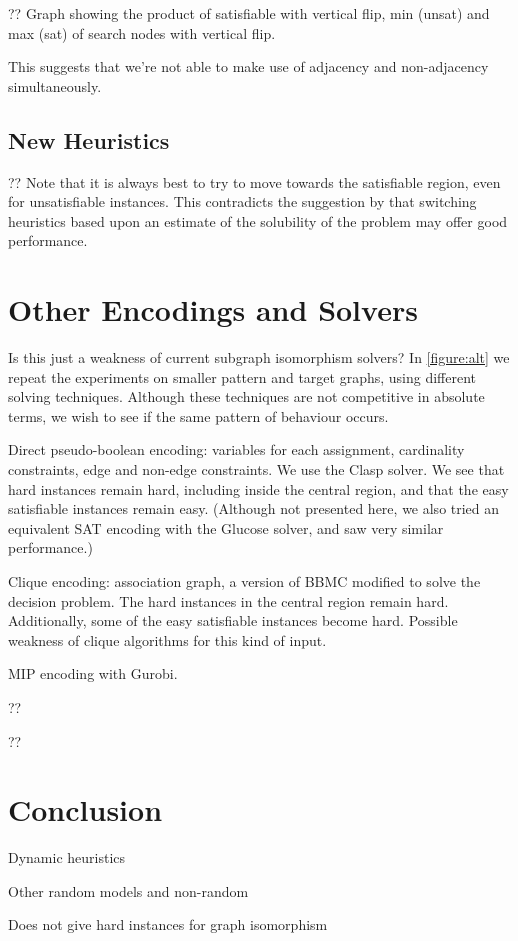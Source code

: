 \documentclass[letterpaper]{article}
\begin{document}
?? Graph showing the product of satisfiable with vertical flip, min (unsat) and max (sat) of search
nodes with vertical flip.

This suggests that we're not able to make use of adjacency and non-adjacency simultaneously.

\subsection{New Heuristics}

?? Note that it is always best to try to move towards the satisfiable region, even for unsatisfiable
instances. This contradicts the suggestion by \citet{Walsh:1998} that switching heuristics based
upon an estimate of the solubility of the problem may offer good performance.

\section{Other Encodings and Solvers}

\begin{figure*}[t]
    
    \caption{Behaviour of other solvers on the induced variant on smaller graphs, shown in the style of
        \cref{figure:non-induced}. The second row shows the number of search nodes used by the Glasgow
        algorithm, the third row shows the number of decisions made by the Clasp pseudo-boolean solver,
        the fourth row shows the number of search nodes used by a clique encoding, and the fifth a mixed
        integer encoding with Gurobi.}\label{figure:alt}
\end{figure*}

Is this just a weakness of current subgraph isomorphism solvers? In \cref{figure:alt} we repeat the
experiments on smaller pattern and target graphs, using different solving techniques. Although these
techniques are not competitive in absolute terms, we wish to see if the same pattern of behaviour
occurs.

Direct pseudo-boolean encoding: variables for each assignment, cardinality constraints, edge and
non-edge constraints. We use the Clasp solver. We see that hard instances remain hard, including
inside the central region, and that the easy satisfiable instances remain easy. (Although not
presented here, we also tried an equivalent SAT encoding with the Glucose solver, and saw very
similar performance.)

Clique encoding: association graph, a version of BBMC modified to solve the decision problem. The
hard instances in the central region remain hard. Additionally, some of the easy satisfiable
instances become hard. Possible weakness of clique algorithms for this kind of input.

MIP encoding with Gurobi.

?? \citep{Anton:2009}

?? \citep{Lipets:2009}

\section{Conclusion}

Dynamic heuristics

Other random models and non-random

Does not give hard instances for graph isomorphism



\end{document}
